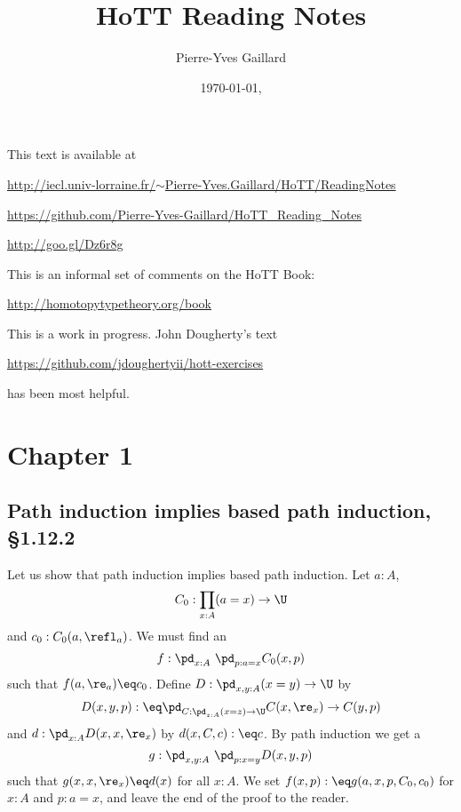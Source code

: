 \documentclass[12pt]{article}
\title{HoTT Reading Notes}
\author{Pierre-Yves Gaillard}
\date{\today, \currenttime}
\begin{document}

\maketitle%

\nn This text is available at 

\nn\href{http://iecl.univ-lorraine.fr/~Pierre-Yves.Gaillard/HoTT/ReadingNotes}{http://iecl.univ-lorraine.fr/$\sim$Pierre-Yves.Gaillard/HoTT/ReadingNotes}


\nn\href{https://github.com/Pierre-Yves-Gaillard/HoTT_Reading_Notes}{https://github.com/Pierre-Yves-Gaillard/HoTT\_Reading\_Notes}

\nn\href{http://goo.gl/Dz6r8g}{http://goo.gl/Dz6r8g}

This is an informal set of comments on the HoTT Book:

\nn\href{http://homotopytypetheory.org/book}{http://homotopytypetheory.org/book}

This is a work in progress. John Dougherty's text 

\nn\href{https://github.com/jdoughertyii/hott-exercises}{https://github.com/jdoughertyii/hott-exercises}

\nn has been most helpful.

\tableofcontents%


\section{Chapter 1}

\subsection{Path induction implies based path induction, \S1.12.2}%

Let us show that path induction implies based path induction. Let $a:A$, 
$$
C_0:\prod_{x:A}(a=x)\to\U
$$ 
and $c_0:C_0(a,\refl_a)$. We must find an 
$$
f:\pd_{x:A}\ \pd_{p:a=x}C_0(x,p)
$$ 
such that $f(a,\re_a)\eq c_0$. Define $D:\pd_{x,y:A}(x=y)\to\U$ by 
$$
D(x,y,p):\eq\pd_{C:\pd_{z:A}(x=z)\to\U}C(x,\re_x)\to C(y,p)
$$ 
and $d:\pd_{x:A}D(x,x,\re_x)$ by $d(x,C,c):\eq c$. By path induction we get a 
$$
g:\pd_{x,y:A}\ \pd_{p:x=y}D(x,y,p)
$$ 
such that $g(x,x,\re_x)\eq d(x)$ for all $x:A$. We set $f(x,p):\eq g(a,x,p,C_0,c_0)$ for $x:A$ and $p:a=x$, and leave the end of the proof to the reader.
\end{document}
